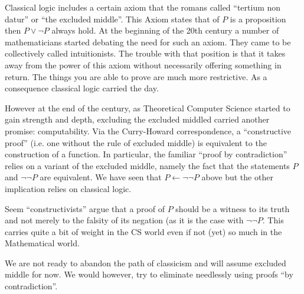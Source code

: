 Classical logic includes a certain axiom that the romans called ``tertium non datur'' or ``the excluded middle''. This Axiom states that of $P$ is a proposition then $P\lor \neg P$ always hold. At the beginning of the 20th century a number of mathematicians started debating the need for such an axiom. They came to be collectively called intuitionists. The trouble with that position is that it takes away from the power of this axiom without necessarily offering something in return. The things you are able to prove are much more restrictive. As a consequence classical logic carried the day.

However at the end of the century, as Theoretical Computer Science started to gain strength and depth, excluding the excluded middled carried another promise: computability. Via the Curry-Howard correspondence, a ``constructive proof'' (i.e. one without the rule of excluded middle) is equivalent to the construction of a function. In particular, the familiar ``proof by contradiction'' relies on a variant of the excluded middle, namely the fact that the statements $P$ and $\neg \neg P$ are equivalent. We have seen that $P \leftarrow \neg \neg P$ above but the other implication relies on classical logic.

Seem ``constructivists'' argue that a proof of $P$ should be a witness to its truth and not merely to the falsity of its negation (as it is the case with $\neg \neg P$. This carries quite a bit of weight in the CS world even if not (yet) so much in the Mathematical world.

We are not ready to abandon the path of classicism and will assume excluded middle for now. We would however, try to eliminate needlessly using proofs ``by contradiction''.
 
